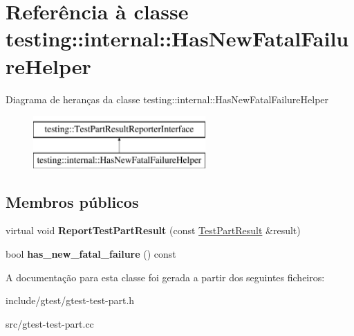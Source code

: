 \hypertarget{classtesting_1_1internal_1_1HasNewFatalFailureHelper}{\section{Referência à classe testing\-:\-:internal\-:\-:Has\-New\-Fatal\-Failure\-Helper}
\label{classtesting_1_1internal_1_1HasNewFatalFailureHelper}
}
Diagrama de heranças da classe testing\-:\-:internal\-:\-:Has\-New\-Fatal\-Failure\-Helper\begin{figure}[H]
\begin{center}
\leavevmode
\includegraphics[height=2.000000cm]{classtesting_1_1internal_1_1HasNewFatalFailureHelper}
\end{center}
\end{figure}
\subsection*{Membros públicos}
\begin{DoxyCompactItemize}
\item 
\hypertarget{classtesting_1_1internal_1_1HasNewFatalFailureHelper_a2d2e1faa1f3669b82810df97ac678a27}{virtual void {\bfseries Report\-Test\-Part\-Result} (const \hyperlink{classtesting_1_1TestPartResult}{Test\-Part\-Result} \&result)}\label{classtesting_1_1internal_1_1HasNewFatalFailureHelper_a2d2e1faa1f3669b82810df97ac678a27}

\item 
\hypertarget{classtesting_1_1internal_1_1HasNewFatalFailureHelper_ae137e639098071f11f531bbd72dde1c7}{bool {\bfseries has\-\_\-new\-\_\-fatal\-\_\-failure} () const }\label{classtesting_1_1internal_1_1HasNewFatalFailureHelper_ae137e639098071f11f531bbd72dde1c7}

\end{DoxyCompactItemize}


A documentação para esta classe foi gerada a partir dos seguintes ficheiros\-:\begin{DoxyCompactItemize}
\item 
include/gtest/gtest-\/test-\/part.\-h\item 
src/gtest-\/test-\/part.\-cc\end{DoxyCompactItemize}
